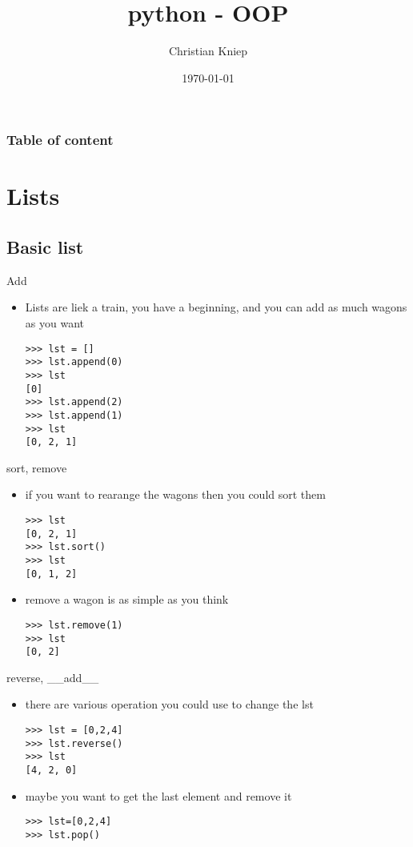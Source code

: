 \documentclass[hyperref={pdfpagelabels=false}]{beamer}
\author{Christian Kniep}
\begin{document}
\title{python - OOP}  
\date[\today]{\today} 

\begin{frame}
	\titlepage
\end{frame} 

\begin{frame}
	\frametitle{Table of content}
	\tableofcontents
\end{frame} 

        
\section{Lists}
    \subsection{Basic list}
        \begin{frame}[fragile]{Add}
        	\begin{itemize}
                \item<1-> Lists are liek a train, you have a beginning, and you can add as much wagons as you want
                    \begin{lstlisting}
>>> lst = []
>>> lst.append(0)
>>> lst
[0]
>>> lst.append(2)
>>> lst.append(1)
>>> lst
[0, 2, 1]
\end{lstlisting}
            \end{itemize}
		\end{frame}
        \begin{frame}[fragile]{sort, remove}
        	\begin{itemize}
                \item<1-> if you want to rearange the wagons then you could sort them
                    \begin{lstlisting}
>>> lst
[0, 2, 1]
>>> lst.sort()
>>> lst
[0, 1, 2]
\end{lstlisting}
                \item<2-> remove a wagon is as simple as you think
                    \begin{lstlisting}
>>> lst.remove(1)
>>> lst
[0, 2]
\end{lstlisting}
            \end{itemize}
		\end{frame}

        \begin{frame}[fragile]{reverse, __add__}
        	\begin{itemize}
                \item<1-> there are various operation you could use to change the lst
                    \begin{lstlisting}
>>> lst = [0,2,4]
>>> lst.reverse()
>>> lst
[4, 2, 0]
\end{lstlisting}
                \item<2-> maybe you want to get the last element and remove it
                    \begin{lstlisting}
>>> lst=[0,2,4]
>>> lst.pop()
\end{lstlisting}

            \end{itemize}
		\end{frame}
\end{document}
